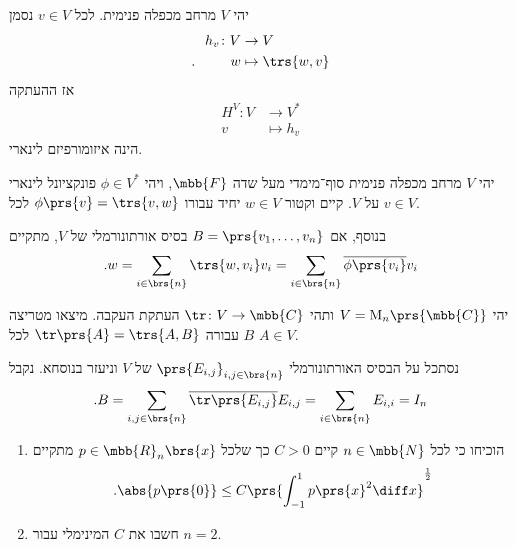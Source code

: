 \documentclass[a4paper,10pt,twoside,openany]{book}
\renewcommand{\Mat}{\mathrm{M}}
\begin{document}
\begin{theorem}
יהי
$V$
מרחב מכפלה פנימית. לכל
$v \in V$
נסמן
\begin{align*}
h_v \colon V &\to V \\
\text{.} \hphantom{lalala} w &\mapsto \trs{w,v}
\end{align*}
אז ההעתקה
\begin{align*}
H^V \colon V &\to V^* \\
v &\mapsto h_v
\end{align*}
הינה איזומורפיזם לינארי.
\end{theorem}

\begin{corollary}
יהי
$V$
מרחב מכפלה פנימית סוף־מימדי מעל שדה
$\mbb{F}$,
ויהי
$\phi \in V^*$
פונקציונל לינארי על
$V$.
קיים וקטור
$w \in V$
יחיד עבורו
$\phi\prs{v} = \trs{v,w}$
לכל
$v \in V$.

בנוסף, אם
$B = \prs{v_1, \ldots, v_n}$
בסיס אורתונורמלי של
$V$,
מתקיים
\[\text{.} w = \sum_{i \in \brs{n}} \trs{w, v_i} v_i = \sum_{i \in \brs{n}} \overline{\phi\prs{v_i}} v_i\]
\end{corollary}

\begin{exercisechap}
יהי
$V = \Mat_n\prs{\mbb{C}}$
ותהי
$\tr \colon V \to \mbb{C}$
העתקת העקבה.
מיצאו מטריצה
$B$
עבורה
$\tr\prs{A} = \trs{A,B}$
לכל
$A \in V$.
\end{exercisechap}

\begin{solution}
נסתכל על הבסיס האורתונורמלי
$\prs{E_{i,j}}_{i,j \in \brs{n}}$
של
$V$
וניעזר בנוסחא. נקבל
\[\text{.} B = \sum_{i,j \in \brs{n}} \overline{\tr\prs{E_{i,j}}} E_{i,j} = \sum_{i \in \brs{n}} E_{i,i} = I_n\]
\end{solution}

\begin{exercisechap}
\begin{enumerate}
\item הוכיחו כי לכל
$n \in \mbb{N}$
קיים
$C > 0$
כך שלכל
$p \in \mbb{R}_n\brs{x}$
מתקיים
\[\text{.} \abs{p\prs{0}} \leq C \prs{\int_{-1}^1 p\prs{x}^2 \diff x}^{\frac{1}{2}}\]

\item חשבו את
$C$
המינימלי עבור
$n=2$.
\end{enumerate}
\end{exercisechap}
\end{document}
